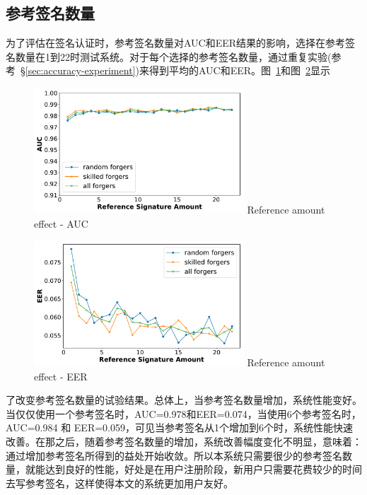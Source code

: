 \subsection{参考签名数量}
为了评估在签名认证时，参考签名数量对AUC和EER结果的影响，选择在参考签名数量在1到22时测试系统。对于每个选择的参考签名数量，通过重复实验(参考~\S\ref{sec:accuracy-experiment})来得到平均的AUC和EER。图~\ref{fig:rcount-auc-lines}和图~\ref{fig:rcount-eer-lines}显示
\begin{figure}[!htp]
  \centering
  \includegraphics[width=0.7\textwidth]{figure/rcount-auc-lines.pdf}
      {Reference amount effect - AUC}
  \label{fig:rcount-auc-lines}
\end{figure}
\begin{figure}[!htp]
  \centering
  \includegraphics[width=0.7\textwidth]{figure/rcount-eer-lines.pdf}
      {Reference amount effect - EER}
  \label{fig:rcount-eer-lines}
\end{figure}
了改变参考签名数量的试验结果。总体上，当参考签名数量增加，系统性能变好。当仅仅使用一个参考签名时，AUC=0.978和EER=0.074，当使用6个参考签名时，AUC=0.984 和 EER=0.059，可见当参考签名从1个增加到6个时，系统性能快速改善。在那之后，随着参考签名数量的增加，系统改善幅度变化不明显，意味着：通过增加参考签名所得到的益处开始收敛。所以本系统只需要很少的参考签名数量，就能达到良好的性能，好处是在用户注册阶段，新用户只需要花费较少的时间去写参考签名，这样使得本文的系统更加用户友好。


